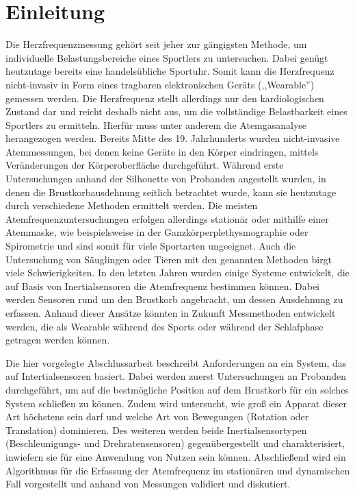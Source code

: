 
\lhead[\chaptername~\thechapter]{\rightmark}


\rhead[\leftmark]{}


\lfoot[\thepage]{}


\cfoot{}


\rfoot[]{\thepage}

\chapter{Einleitung}
Die Herzfrequenzmessung gehört seit jeher zur gängigsten Methode, um individuelle Belastungsbereiche eines Sportlers zu untersuchen. Dabei genügt heutzutage bereits eine handelsübliche Sportuhr. Somit kann die Herzfrequenz nicht-invasiv in Form eines tragbaren elektronischen Geräts (,,Wearable'') gemessen werden. Die Herzfrequenz stellt allerdings nur den kardiologischen Zustand dar und reicht deshalb nicht aus, um die vollständige Belastbarkeit eines Sportlers zu ermitteln. Hierfür muss unter anderem die Atemgasanalyse herangezogen werden. Bereits Mitte des 19. Jahrhunderts wurden nicht-invasive Atemmessungen, bei denen keine Geräte in den Körper eindringen, mittels Veränderungen der Körperoberfläche durchgeführt. Während erste Untersuchungen anhand der Silhouette von Probanden angestellt wurden, in denen die Brustkorbausdehnung seitlich betrachtet wurde, kann sie heutzutage durch verschiedene Methoden ermittelt werden. Die meisten Atemfrequenzuntersuchungen erfolgen allerdings stationär oder mithilfe einer Atemmaske, wie beispielsweise in der Ganzkörperplethysmographie oder Spirometrie und sind somit für viele Sportarten ungeeignet. Auch die Untersuchung von Säuglingen oder Tieren mit den genannten Methoden birgt viele Schwierigkeiten\cite{heyde}. In den letzten Jahren wurden einige Systeme entwickelt, die auf Basis von Inertialsensoren die Atemfrequenz bestimmen können. Dabei werden Sensoren rund um den Brustkorb angebracht, um dessen Ausdehnung zu erfassen. Anhand dieser Ansätze könnten in Zukunft Messmethoden entwickelt werden, die als Wearable während des Sports oder während der Schlafphase getragen werden können.

Die hier vorgelegte Abschlussarbeit beschreibt Anforderungen an ein System, das auf Intertialsensoren basiert. Dabei werden zuerst Untersuchungen an Probanden durchgeführt, um auf die bestmögliche Position auf dem Brustkorb für ein solches System schließen zu können. Zudem wird untersucht, wie groß ein Apparat dieser Art höchstens sein darf und welche Art von Bewegungen (Rotation oder Translation) dominieren. Des weiteren werden beide Inertialsensortypen (Beschleunigungs- und Drehratensensoren) gegenübergestellt und charakterisiert, inwiefern sie für eine Anwendung von Nutzen sein können. Abschließend wird ein Algorithmus für die Erfassung der Atemfrequenz im stationären und dynamischen Fall vorgestellt und anhand von Messungen validiert und diskutiert.